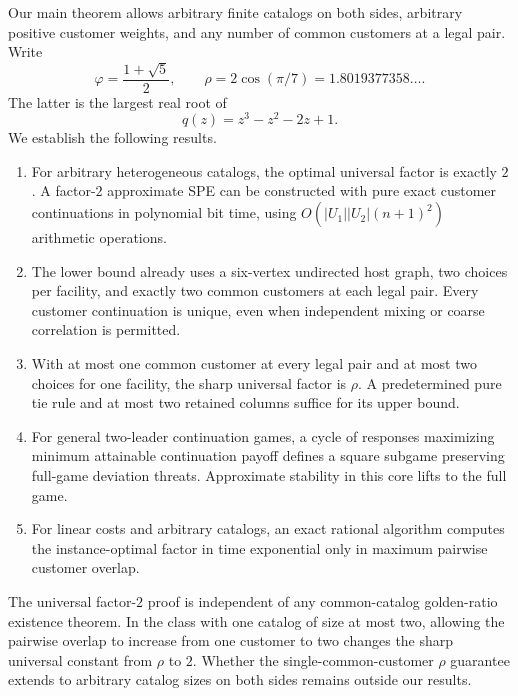 \documentclass[11pt]{article}
\theoremstyle{definition}
\theoremstyle{remark}
\newcommand{\phiG}{\varphi}
\newcommand{\rhoG}{\rho}
\newcommand{\Uone}{U_1}
\newcommand{\Utwo}{U_2}
\begin{document}
Our main theorem allows arbitrary finite catalogs on both sides, arbitrary positive customer weights, and any number of common customers at a legal pair. Write
\[
 \phiG=\frac{1+\sqrt5}{2},\qquad
 \rhoG=2\cos(\pi/7)=1.8019377358\ldots.
\]
The latter is the largest real root of
\begin{equation}\label{eq:cubic}
 q(z)=z^3-z^2-2z+1.
\end{equation}
We establish the following results.
\begin{enumerate}
\item For arbitrary heterogeneous catalogs, the optimal universal factor is exactly $2$. A factor-$2$ approximate SPE can be constructed with pure exact customer continuations in polynomial bit time, using $O(|\Uone||\Utwo|(n+1)^2)$ arithmetic operations.
\item The lower bound already uses a six-vertex undirected host graph, two choices per facility, and exactly two common customers at each legal pair. Every customer continuation is unique, even when independent mixing or coarse correlation is permitted.
\item With at most one common customer at every legal pair and at most two choices for one facility, the sharp universal factor is $\rhoG$. A predetermined pure tie rule and at most two retained columns suffice for its upper bound.
\item For general two-leader continuation games, a cycle of responses maximizing minimum attainable continuation payoff defines a square subgame preserving full-game deviation threats. Approximate stability in this core lifts to the full game.
\item For linear costs and arbitrary catalogs, an exact rational algorithm computes the instance-optimal factor in time exponential only in maximum pairwise customer overlap.
\end{enumerate}
The universal factor-$2$ proof is independent of any common-catalog golden-ratio existence theorem. In the class with one catalog of size at most two, allowing the pairwise overlap to increase from one customer to two changes the sharp universal constant from $\rhoG$ to $2$. Whether the single-common-customer $\rhoG$ guarantee extends to arbitrary catalog sizes on both sides remains outside our results.
\end{document}
